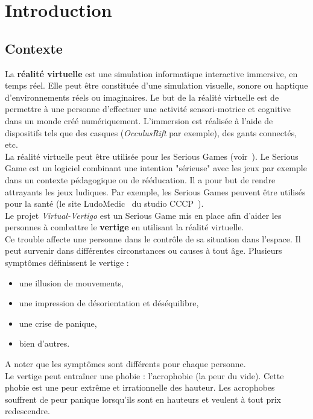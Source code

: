 \chapter{Introduction}
\section{Contexte}
La \textbf{réalité virtuelle} est une simulation informatique interactive immersive, en temps réel. Elle peut être constituée d'une simulation visuelle, sonore ou haptique d'environnements réels ou imaginaires. Le but de la réalité virtuelle est de permettre à une personne d'effectuer une activité sensori-motrice et cognitive dans un monde créé numériquement. L'immersion est réalisée à l'aide de dispositifs tels que des casques (\textit{OcculusRift} par exemple), des gants connectés, etc. \\
La réalité virtuelle peut être utilisée pour les \textsf{Serious Games} (voir~\cite{SeriousGame}). Le \textsf{Serious Game} est un logiciel combinant une intention "sérieuse" avec les jeux par exemple dans un contexte pédagogique ou de rééducation. Il a pour but de rendre attrayants les jeux ludiques. Par exemple, les \textsf{Serious Games} peuvent être utilisés pour la santé (le site LudoMedic~\cite{LudoMedic} du studio CCCP~\cite{cccp}).\\

Le projet \textit{Virtual-Vertigo} est un \textsf{Serious Game} mis en place afin d'aider les personnes à combattre le \textbf{vertige} en utilisant la réalité virtuelle.\\
Ce trouble affecte une personne dans le contrôle de sa situation dans l'espace. Il peut survenir dans différentes circonstances ou causes à tout âge. Plusieurs symptômes définissent le vertige : 
\begin{itemize}
\item une illusion de mouvements,
\item une impression de désorientation et déséquilibre,
\item une crise de panique,
\item bien d'autres.
\end{itemize}
A noter que les symptômes sont différents pour chaque personne. \\
Le vertige peut entraîner une phobie : l'acrophobie (la peur du vide). Cette phobie est une peur extrême et irrationnelle des hauteur. Les acrophobes souffrent de peur panique lorsqu'ils sont en hauteurs et veulent à tout prix redescendre. \\

